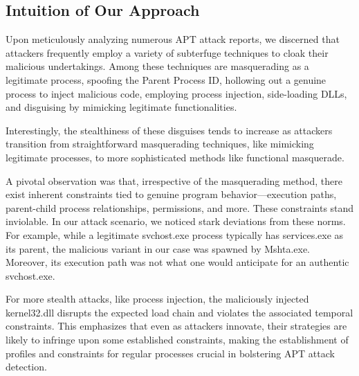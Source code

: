 \subsection{Intuition of Our Approach}
Upon meticulously analyzing numerous APT attack reports, we discerned that attackers frequently employ a variety of subterfuge techniques to cloak their malicious undertakings. Among these techniques are masquerading as a legitimate process, spoofing the Parent Process ID, hollowing out a genuine process to inject malicious code, employing process injection, side-loading DLLs, and disguising by mimicking legitimate functionalities.

Interestingly, the stealthiness of these disguises tends to increase as attackers transition from straightforward masquerading techniques, like mimicking legitimate processes, to more sophisticated methods like functional masquerade.

A pivotal observation was that, irrespective of the masquerading method, there exist inherent constraints tied to genuine program behavior—execution paths, parent-child process relationships, permissions, and more. These constraints stand inviolable. In our attack scenario, we noticed stark deviations from these norms. For example, while a legitimate svchost.exe process typically has services.exe as its parent, the malicious variant in our case was spawned by Mshta.exe. Moreover, its execution path was not what one would anticipate for an authentic svchost.exe.

For more stealth attacks, like process injection, the maliciously injected kernel32.dll disrupts the expected load chain and violates the associated temporal constraints. This emphasizes that even as attackers innovate, their strategies are likely to infringe upon some established constraints, making the establishment of profiles and constraints for regular processes crucial in bolstering APT attack detection.

